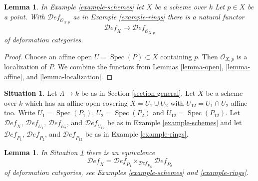 \documentclass{stacks-project}
\theoremstyle{plain}
\newtheorem{lemma}[subsection]{Lemma}
\theoremstyle{definition}
\newtheorem{situation}[subsection]{Situation}
\theoremstyle{remark}
\numberwithin{equation}{subsection}
\def\Spec{\mathop{\mathrm{Spec}}}
\def\Deformationcategory{\mathcal{D}\!\mathit{ef}}
\begin{document}
\begin{lemma}
\label{lemma-local-ring}
In Example \ref{example-schemes} let $X$ be a scheme over $k$
Let $p \in X$ be a point. With $\Deformationcategory_{\mathcal{O}_{X, p}}$
as in Example \ref{example-rings} there is a natural functor
$$
\Deformationcategory_X
\longrightarrow
\Deformationcategory_{\mathcal{O}_{X, p}}
$$
of deformation categories.
\end{lemma}

\begin{proof}
Choose an affine open $U = \Spec(P) \subset X$ containing $p$.
Then $\mathcal{O}_{X, p}$ is a localization of $P$. We combine
the functors from
Lemmas \ref{lemma-open}, \ref{lemma-affine}, and \ref{lemma-localization}.
\end{proof}

\begin{situation}
\label{situation-glueing}
Let $\Lambda \to k$ be as in Section \ref{section-general}.
Let $X$ be a scheme over $k$ which has an affine open covering
$X = U_1 \cup U_2$ with $U_{12} = U_1 \cap U_2$ affine too.
Write $U_1 = \Spec(P_1)$, $U_2 = \Spec(P_2)$ and $U_{12} = \Spec(P_{12})$.
Let $\Deformationcategory_X$, $\Deformationcategory_{U_1}$,
$\Deformationcategory_{U_2}$, and $\Deformationcategory_{U_{12}}$
be as in Example \ref{example-schemes} and let
$\Deformationcategory_{P_1}$, $\Deformationcategory_{P_2}$, and
$\Deformationcategory_{P_{12}}$ be as in Example \ref{example-rings}.
\end{situation}

\begin{lemma}
\label{lemma-glueing}
In Situation \ref{situation-glueing}
there is an equivalence
$$
\Deformationcategory_X =
\Deformationcategory_{P_1}
\times_{\Deformationcategory_{P_{12}}}
\Deformationcategory_{P_2}
$$
of deformation categories, see Examples \ref{example-schemes} and
\ref{example-rings}.
\end{lemma}
\end{document}
